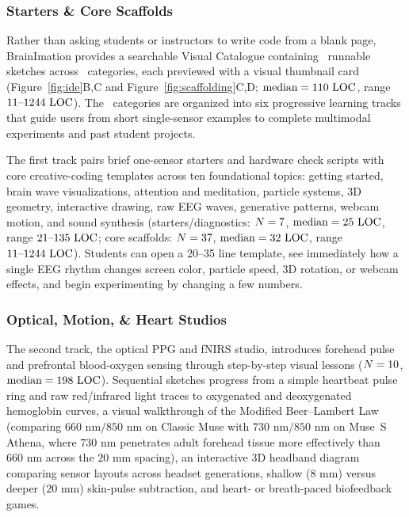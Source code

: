 \documentclass[11pt]{article}
\begin{document}
\subsubsection{Starters \& Core Scaffolds}
Rather than asking students or instructors to write code from a blank page, BrainImation provides a searchable Visual Catalogue containing \NCatalogueSketches\ runnable sketches across \NCatalogueCategories\ categories, each previewed with a visual thumbnail card (Figure~\ref{fig:ide}B,C and Figure~\ref{fig:scaffolding}C,D; $\text{median} = 110\text{ LOC}$, range $11\text{--}1244\text{ LOC}$). The \NCatalogueCategories\ categories are organized into six progressive learning tracks that guide users from short single-sensor examples to complete multimodal experiments and past student projects.

The first track pairs brief one-sensor starters and hardware check scripts with core creative-coding templates across ten foundational topics: getting started, brain wave visualizations, attention and meditation, particle systems, 3D geometry, interactive drawing, raw EEG waves, generative patterns, webcam motion, and sound synthesis (starters/diagnostics: $N = 7$, $\text{median} = 25\text{ LOC}$, range $21\text{--}135\text{ LOC}$; core scaffolds: $N = 37$, $\text{median} = 32\text{ LOC}$, range $11\text{--}1244\text{ LOC}$). Students can open a 20--35 line template, see immediately how a single EEG rhythm changes screen color, particle speed, 3D rotation, or webcam effects, and begin experimenting by changing a few numbers.

\subsubsection{Optical, Motion, \& Heart Studios}
The second track, the optical PPG and fNIRS studio, introduces forehead pulse and prefrontal blood-oxygen sensing through step-by-step visual lessons \citep{wyser2020short,russo2025fnirs} ($N = 10$, $\text{median} = 198\text{ LOC}$). Sequential sketches progress from a simple heartbeat pulse ring and raw red/infrared light traces to oxygenated and deoxygenated hemoglobin curves, a visual walkthrough of the Modified Beer--Lambert Law (comparing $660\text{ nm}/850\text{ nm}$ on Classic Muse with $730\text{ nm}/850\text{ nm}$ on Muse~S Athena, where $730\text{ nm}$ penetrates adult forehead tissue more effectively than $660\text{ nm}$ across the $20\text{ mm}$ spacing), an interactive 3D headband diagram comparing sensor layouts across headset generations, shallow ($8\text{ mm}$) versus deeper ($20\text{ mm}$) skin-pulse subtraction, and heart- or breath-paced biofeedback games.
\end{document}
